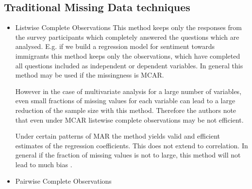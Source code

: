 \subsection{Traditional Missing Data techniques} 

\begin{itemize}
\item Listwise Complete Observations
This method keeps only the responses from the survey participants which completely answered the questions which are analysed. E.g. if we build a regression model for sentiment towards immigrants this method keeps only the observations, which have completed all questions included as independent or dependent variables.
In general this method may be used if the missingness is MCAR. \par However in the case of multivariate analysis for a large number of variables, even small fractions of missing values for each variable can lead to a large reduction of the sample size with this method. Therefore the authors note that even under MCAR listewise complete observations may be not efficient. \par Under certain patterns of MAR the method yields valid and efficient estimates of the regression coefficients. This does not extend to correlation. In general if the fraction of missing values is not to large, this method will not lead to much bias \cite{schafer2002missing}.  
\item Pairwise Complete Observations 


\end{itemize}
